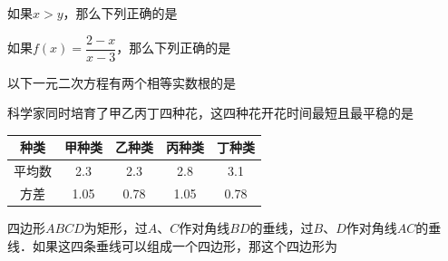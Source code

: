 \documentclass{article}
\begin{document}
\lfoot{}
\rfoot{}
\cfoot{}

\newpage

\cfoot{}




\begin{question}[1]
    \item 如果$x>y$，那么下列正确的是
\end{question}

\begin{question}[2]
    \item 如果$f(x)=\dfrac{2-x}{x-3}$，那么下列正确的是
\end{question}

\begin{question}[3]
    \item 以下一元二次方程有两个相等实数根的是
\end{question}

\begin{question}[4]
    \item 科学家同时培育了甲乙丙丁四种花，这四种花开花时间最短且最平稳的是
    \begin{center}
        \begin{tabular}{|c|c|c|c|c|} \hline
            种类 & 甲种类 & 乙种类 & 丙种类 & 丁种类 \\ \hline
            平均数 & 2.3 & 2.3 & 2.8 & 3.1 \\ \hline
            方差 & 1.05 & 0.78 & 1.05 & 0.78 \\ \hline
        \end{tabular}
    \end{center} \leavevmode
\end{question}

\begin{question}[5]
    \item 四边形$ABCD$为矩形，过$A$、$C$作对角线$BD$的垂线，过$B$、$D$作对角线$AC$的垂线．如果这四条垂线可以组成一个四边形，那这个四边形为
\end{question}
\end{document}
